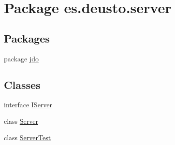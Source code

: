 \hypertarget{namespacees_1_1deusto_1_1server}{}\section{Package es.\+deusto.\+server}
\label{namespacees_1_1deusto_1_1server}
\subsection*{Packages}
\begin{DoxyCompactItemize}
\item 
package \hyperlink{namespacees_1_1deusto_1_1server_1_1jdo}{jdo}
\end{DoxyCompactItemize}
\subsection*{Classes}
\begin{DoxyCompactItemize}
\item 
interface \hyperlink{interfacees_1_1deusto_1_1server_1_1_i_server}{I\+Server}
\item 
class \hyperlink{classes_1_1deusto_1_1server_1_1_server}{Server}
\item 
class \hyperlink{classes_1_1deusto_1_1server_1_1_server_test}{Server\+Test}
\end{DoxyCompactItemize}
